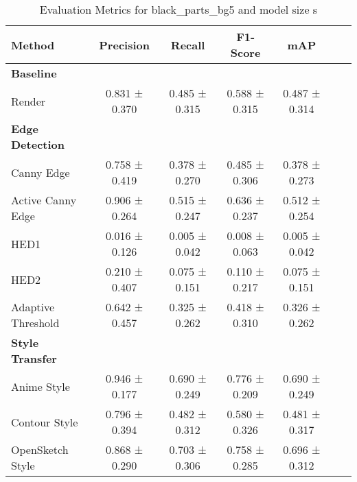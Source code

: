 \begin{table}[H]
    \scriptsize
    \caption{Evaluation Metrics for black_parts_bg5 and model size s}
    \begin{tabular}{lcccccc}
        \toprule
        \textbf{Method} & \textbf{Precision} & \textbf{Recall} & \textbf{F1-Score} & \textbf{mAP} \\
        \midrule
        \textbf{Baseline} & & & & \\
        Render & 0.831 ± 0.370 & 0.485 ± 0.315 & 0.588 ± 0.315 & 0.487 ± 0.314 \\
        \midrule
        \textbf{Edge Detection} & & & & \\
        Canny Edge & 0.758 ± 0.419 & 0.378 ± 0.270 & 0.485 ± 0.306 & 0.378 ± 0.273 \\
        Active Canny Edge & 0.906 ± 0.264 & 0.515 ± 0.247 & 0.636 ± 0.237 & 0.512 ± 0.254 \\
        HED1 & 0.016 ± 0.126 & 0.005 ± 0.042 & 0.008 ± 0.063 & 0.005 ± 0.042 \\
        HED2 & 0.210 ± 0.407 & 0.075 ± 0.151 & 0.110 ± 0.217 & 0.075 ± 0.151 \\
        Adaptive Threshold & 0.642 ± 0.457 & 0.325 ± 0.262 & 0.418 ± 0.310 & 0.326 ± 0.262 \\
        \midrule
        \textbf{Style Transfer} & & & & \\
        Anime Style & 0.946 ± 0.177 & 0.690 ± 0.249 & 0.776 ± 0.209 & 0.690 ± 0.249 \\
        Contour Style & 0.796 ± 0.394 & 0.482 ± 0.312 & 0.580 ± 0.326 & 0.481 ± 0.317 \\
        OpenSketch Style & 0.868 ± 0.290 & 0.703 ± 0.306 & 0.758 ± 0.285 & 0.696 ± 0.312 \\
        \bottomrule
    \end{tabular}
\end{table}
